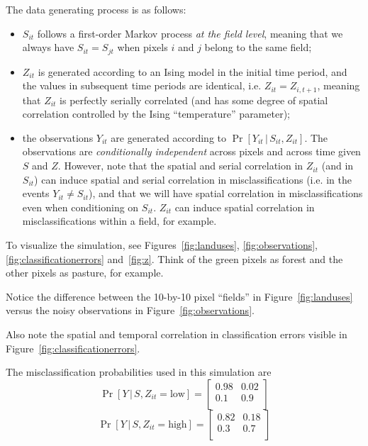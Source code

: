 \documentclass[12pt]{article}
\begin{document}
The data generating process is as follows:
\begin{itemize}
\item $S_{it}$ follows a first-order Markov process \textit{at the field level}, meaning that we always have $S_{it} = S_{jt}$ when pixels $i$ and $j$ belong to the same field;
\item $Z_{it}$ is generated according to an Ising model in the initial time period, and the values in subsequent time periods are identical, i.e. $Z_{it} = Z_{i,t+1}$, meaning that $Z_{it}$ is perfectly serially correlated (and has some degree of spatial correlation controlled by the Ising ``temperature'' parameter);
\item the observations $Y_{it}$ are generated according to $\Pr\left[Y_{it} \,|\, S_{it}, Z_{it}\right]$. The observations are \textit{conditionally independent} across pixels and across time given $S$ and $Z$. However, note that the spatial and serial correlation in $Z_{it}$ (and in $S_{it}$) can induce spatial and serial correlation in misclassifications (i.e. in the events $Y_{it} \neq S_{it}$), and that we will have spatial correlation in misclassifications even when conditioning on $S_{it}$. $Z_{it}$ can induce spatial correlation in misclassifications within a field, for example.
\end{itemize}

To visualize the simulation, see Figures~\ref{fig:landuses}, \ref{fig:observations}, \ref{fig:classificationerrors} and~\ref{fig:z}.
Think of the green pixels as forest and the other pixels as pasture, for example.

Notice the difference between the 10-by-10 pixel ``fields'' in Figure~\ref{fig:landuses}
versus the noisy observations in Figure~\ref{fig:observations}.

Also note the spatial and temporal correlation in classification errors visible in Figure~\ref{fig:classificationerrors}.

The misclassification probabilities used in this simulation are
\begin{equation}
  \Pr\left[Y \,|\, S, Z_{it} = \textrm{low}\right] =
    \begin{bmatrix}
    0.98 & 0.02 \\
    0.1 & 0.9 \\
    \end{bmatrix}%
\end{equation}
\begin{equation}
  \Pr\left[Y \,|\, S, Z_{it} = \textrm{high}\right] =
    \begin{bmatrix}
    0.82 & 0.18 \\
    0.3 & 0.7 \\
    \end{bmatrix}%
\end{equation}
\end{document}
